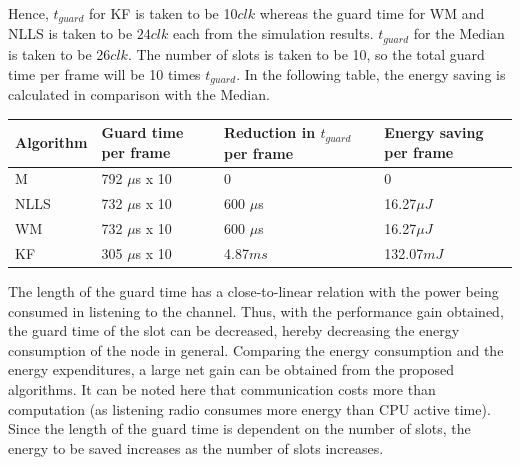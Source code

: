 \documentclass[journal]{IEEEtran}
\begin{document}
Hence, $t_{guard}$ for KF is taken to be 10$clk$ whereas the guard time for WM and NLLS is taken to be $24clk$ each from the simulation results. $t_{guard}$ for the Median is taken to be 26$clk$. The number of slots is taken to be 10, so the total guard time per frame will be 10 times $t_{guard}$. In the following table, the energy saving is calculated in comparison with the Median. 
\begin{center}
    \begin{tabular}{ |p{1.5cm} | p{2cm} |p{2cm} | p{1.75cm} |  }
    \hline
    Algorithm & Guard time per frame & Reduction in $t_{guard}$ per frame & Energy saving per frame\\ \hline
    M &  792 $\mu$s x 10 & 0 & 0 \\ \hline
    NLLS & 732 $\mu$s x 10 & 600 $\mu$s & 16.27$\mu J$\\ \hline
    WM &   732 $\mu$s x 10 & 600 $\mu$s & 16.27$\mu J$ \\ \hline
    KF &  305 $\mu$s x 10 & 4.87$ms$ & 132.07$mJ$\\ \hline
    \end{tabular}
\label{tab}
\end{center}
The length of the guard time has a close-to-linear relation with the power being consumed in listening to the channel. Thus, with the performance gain obtained, the guard time of the slot can be decreased, hereby decreasing the energy consumption of the node in general. Comparing the energy consumption and the energy expenditures, a large net gain can be obtained from the proposed algorithms. It can be noted here that communication costs more than computation (as listening radio consumes more energy than CPU active time). Since the length of the guard time is dependent on the number of slots, the energy to be saved increases as the number of slots increases.
\end{document}
